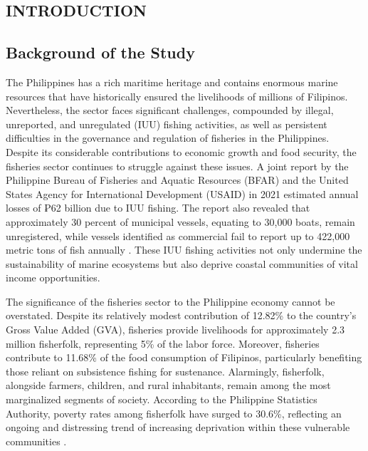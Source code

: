 \documentclass{icsthesis}
\begin{document}
	\begin{mainmatter}
		\section{INTRODUCTION}
			\subsection{Background of the Study}
            The Philippines has a rich maritime heritage and contains enormous marine resources that have historically ensured the livelihoods of millions of Filipinos. Nevertheless, the sector faces significant challenges, compounded by illegal, unreported, and unregulated (IUU) fishing activities, as well as persistent difficulties in the governance and regulation of fisheries in the Philippines. Despite its considerable contributions to economic growth and food security, the fisheries sector continues to struggle against these issues. A joint report by the Philippine Bureau of Fisheries and Aquatic Resources (BFAR) and the United States Agency for International Development (USAID) in 2021 estimated annual losses of ₱62 billion due to IUU fishing. The report also revealed that approximately 30 percent of municipal vessels, equating to 30,000 boats, remain unregistered, while vessels identified as commercial fail to report up to 422,000 metric tons of fish annually \citep{Coastal2021}. These IUU fishing activities not only undermine the sustainability of marine ecosystems but also deprive coastal communities of vital income opportunities.
            
            The significance of the fisheries sector to the Philippine economy cannot be overstated. Despite its relatively modest contribution of 12.82\% to the country's Gross Value Added (GVA), fisheries provide livelihoods for approximately 2.3 million fisherfolk, representing 5\% of the labor force. Moreover, fisheries contribute to 11.68\% of the food consumption of Filipinos, particularly benefiting those reliant on subsistence fishing for sustenance. Alarmingly, fisherfolk, alongside farmers, children, and rural inhabitants, remain among the most marginalized segments of society. According to the Philippine Statistics Authority, poverty rates among fisherfolk have surged to 30.6\%, reflecting an ongoing and distressing trend of increasing deprivation within these vulnerable communities \citep{PSA2023}.
            

\end{mainmatter}
\end{document}
